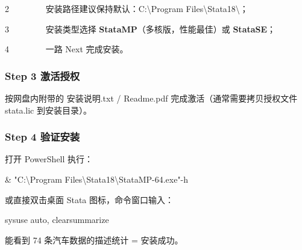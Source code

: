 \documentclass[
  american,
  chinese,
]{ctexart}
\begin{document}
\foreignlanguage{american}{{2{~~~~~~~~
}}}{\foreignlanguage{american}{安装路径建议保持默认：}\foreignlanguage{american}{C}}\foreignlanguage{american}{:\textbackslash Program Files{\textbackslash Stata18\textbackslash{}{；}}}

\foreignlanguage{american}{{3{~~~~~~~~
}}}{\foreignlanguage{american}{安装类型选择}}\foreignlanguage{american}{ {\textbf{StataMP}{（多核版，性能最佳）或}}
{{\textbf{StataSE}}}}{\foreignlanguage{american}{；}}

\foreignlanguage{american}{{4{~~~~~~~~
}}}{\foreignlanguage{american}{一路}}\foreignlanguage{american}{ Next }{\foreignlanguage{american}{完成安装}}\foreignlanguage{american}{。}

\subsubsection{\texorpdfstring{\foreignlanguage{american}{Step 3 }{\foreignlanguage{american}{激活授权}}}{Step 3 激活授权}}\label{step-3-ux6fc0ux6d3bux6388ux6743}

{\foreignlanguage{american}{按网盘内附带的}}\foreignlanguage{american}{ }\foreignlanguage{american}{安装说明}\foreignlanguage{american}{.txt / Readme.pdf }{\foreignlanguage{american}{完成激活（通常需要拷贝授权文件}}\foreignlanguage{american}{ {stata.lic} }{\foreignlanguage{american}{到安装目录}}\foreignlanguage{american}{）。}

\subsubsection{\texorpdfstring{\foreignlanguage{american}{Step 4 }{\foreignlanguage{american}{验证安装}}}{Step 4 验证安装}}\label{step-4-ux9a8cux8bc1ux5b89ux88c5}

{\foreignlanguage{american}{打开}}\foreignlanguage{american}{ PowerShell }{\foreignlanguage{american}{执行}}\foreignlanguage{american}{：}

\foreignlanguage{american}{\&
"C:\textbackslash Program Files\textbackslash Stata18\textbackslash StataMP-64.exe"-h}

{或直接双击桌面}\foreignlanguage{american}{ Stata }{图标，命令窗口输入：}\foreignlanguage{american}{}

{\foreignlanguage{american}{sysuse}}\foreignlanguage{american}{ auto, {clearsummarize}}

{\foreignlanguage{american}{能看到}}\foreignlanguage{american}{ 74 }{\foreignlanguage{american}{条汽车数据的描述统计}}\foreignlanguage{american}{ = }{\foreignlanguage{american}{安装成功}}\foreignlanguage{american}{。}
\end{document}
